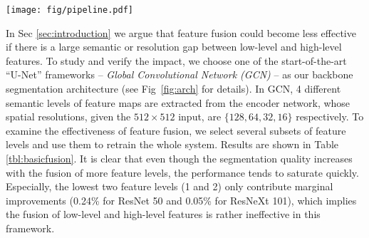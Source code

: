 \documentclass[runningheads]{llncs}
\begin{document}
\begin{figure*}[t]
\begin{center}
\texttt{[image: fig/pipeline.pdf]}
\end{center}
   \caption{Overall architecture of our approach. Components with solid boxes belong to the backbone \emph{GCN} framework \cite{Peng2017Large}, while others with dashed lines are proposed in this work. Similar to \cite{Peng2017Large}, \emph{Boundary Refinement} blocks are actually used but omitted in the figure. Numbers ($H\times W \times C$) in blocks specify the output dimension of each component. \textbf{SS} -- semantic supervision. \textbf{ECRE} -- explicit channel resolution embedding. \textbf{SEB} -- semantic embedding branch. \textbf{DAP} -- densely adjacent prediction.}
\label{fig:arch}
\end{figure*}


In Sec \ref{sec:introduction} we argue that feature fusion could become less effective if there is a large semantic or resolution gap between low-level and high-level features. To study and verify the impact, we choose one of the start-of-the-art ``U-Net'' frameworks -- \emph{Global Convolutional Network (GCN)} \cite{Peng2017Large} -- as our backbone segmentation architecture (see Fig~\ref{fig:arch} for details). In GCN, 4 different semantic levels of feature maps are extracted from the encoder network, whose spatial resolutions, given the $512\times 512$ input, are $\{128,64,32,16\}$ respectively. To examine the effectiveness of feature fusion, we select several subsets of feature levels and use them to retrain the whole system. Results are shown in Table \ref{tbl:basicfusion}. It is clear that even though the segmentation quality increases with the fusion of more feature levels, the performance tends to saturate quickly. Especially, the lowest two feature levels (1 and 2) only contribute marginal improvements (0.24\% for ResNet 50 and 0.05\% for ResNeXt 101), which implies the fusion of low-level and high-level features is rather ineffective in this framework.
\end{document}
